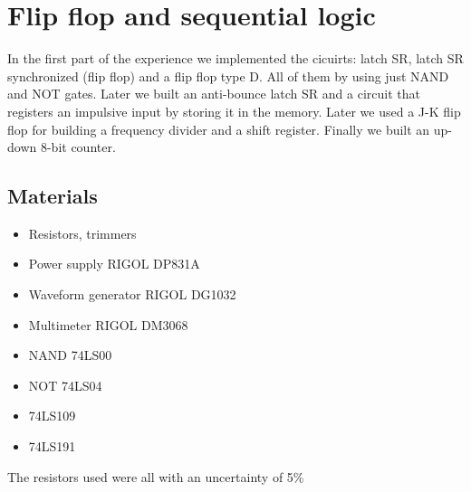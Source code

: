 \chapter{Flip flop and sequential logic}
In the first part of the experience we implemented the cicuirts: latch SR, latch SR synchronized (flip flop) and a flip flop type D. All of them by using just NAND and NOT gates. Later we built an anti-bounce latch SR and a circuit that registers an impulsive input by storing it in the memory. Later we used a J-K flip flop for building a frequency divider and a shift register. Finally we built an up-down 8-bit counter.

\section{Materials}
\begin{itemize}
\item Resistors, trimmers
\item Power supply RIGOL DP831A
\item Waveform generator RIGOL DG1032
\item Multimeter RIGOL DM3068
\item NAND 74LS00
\item NOT 74LS04
\item 74LS109
\item 74LS191
\end{itemize}
The resistors used were all with an uncertainty of 5\%

